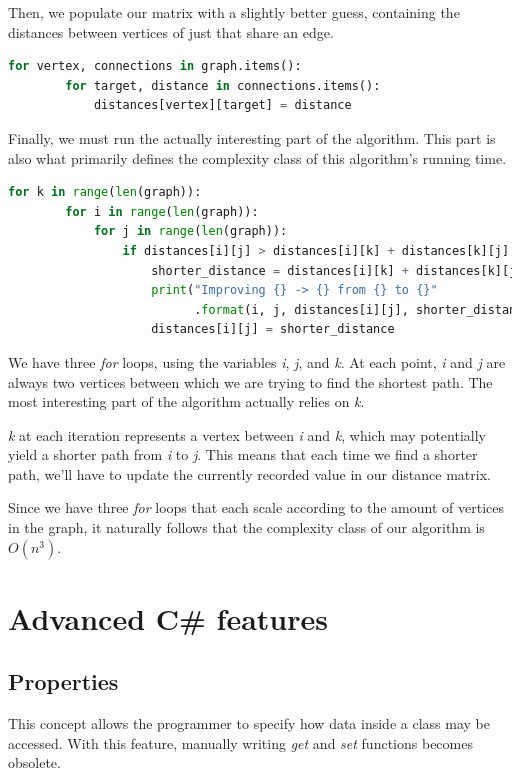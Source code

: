 \documentclass{article}
\begin{document}
Then, we populate our matrix with a slightly better guess, containing the distances between vertices of just that share an edge.

\begin{lstlisting}[language=Python]
    for vertex, connections in graph.items():
        for target, distance in connections.items():
            distances[vertex][target] = distance
\end{lstlisting}

Finally, we must run the actually interesting part of the algorithm.
This part is also what primarily defines the complexity class of this algorithm's running time.

\begin{lstlisting}[language=Python]
  for k in range(len(graph)):
        for i in range(len(graph)):
            for j in range(len(graph)):
                if distances[i][j] > distances[i][k] + distances[k][j]:
                    shorter_distance = distances[i][k] + distances[k][j]
                    print("Improving {} -> {} from {} to {}"
                          .format(i, j, distances[i][j], shorter_distance))
                    distances[i][j] = shorter_distance
\end{lstlisting}

We have three {\em for} loops, using the variables {\em i}, {\em j}, and {\em k}.
At each point, {\em i} and {\em j} are always two vertices between which we are trying to find the shortest path. The most interesting part of the algorithm actually relies on {\em k}.

{\em k} at each iteration represents a vertex between {\em i} and {\em k}, which may potentially yield a shorter path from {\em i} to {\em j}. This means that each time we find a shorter path, we'll have to update the currently recorded value in our distance matrix.

Since we have three {\em for} loops that each scale according to the amount of vertices in the graph,
it naturally follows that the complexity class of our algorithm is \(O(n^3)\).

\newpage

\section{Advanced C\# features}
\subsection{Properties}
This concept allows the programmer to specify how data inside a class may be accessed.
With this feature, manually writing {\em get} and {\em set} functions becomes obsolete.
\end{document}
